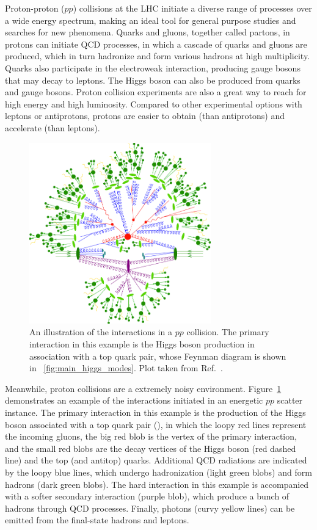 Proton-proton ($pp$) collisions at the LHC initiate a diverse range of processes over a wide energy spectrum,
making an ideal tool for general purpose studies and searches for new phenomena.
Quarks and gluons, together called partons, in protons can initiate QCD processes, 
in which a cascade of quarks and gluons are produced, which in turn hadronize and form various hadrons at high multiplicity.
Quarks also participate in the electroweak interaction, producing gauge bosons that may decay to leptons.
The Higgs boson can also be produced from quarks and gauge bosons.
Proton collision experiments are also a great way to reach for high energy and high luminosity.
Compared to other experimental options with leptons or antiprotons, 
protons are easier to obtain (than antiprotons) and accelerate (than leptons).

\begin{figure}[!htb]
    \centering
    \captionsetup{justification=justified}
    \includegraphics[width=0.70\textwidth]{pics/LHC_CMS/sherpa_sim.png}
    \caption{An illustration of the interactions in a $pp$ collision.
             The primary interaction in this example is the Higgs boson production in association with a top quark pair, 
             whose Feynman diagram is shown in ~\ref{fig:main_higgs_modes}.
             Plot taken from Ref.~\cite{Gleisberg_2009}.}
    \label{fig:sherpa_pp}
\end{figure}

Meanwhile, proton collisions are a extremely noisy environment.
Figure~\ref{fig:sherpa_pp} demonstrates an example of the interactions initiated in an energetic $pp$ scatter instance.
The primary interaction in this example is the production of the Higgs boson associated with a top quark pair (\ttH),
in which the loopy red lines represent the incoming gluons, the big red blob is the vertex of the primary interaction,
and the small red blobs are the decay vertices of the Higgs boson (red dashed line) and the top (and antitop) quarks.
Additional QCD radiations are indicated by the loopy blue lines, which undergo hadronization (light green blobs) and form hadrons (dark green blobs). 
The hard interaction in this example is accompanied with a softer secondary interaction (purple blob), 
which produce a bunch of hadrons through QCD processes.
Finally, photons (curvy yellow lines) can be emitted from the final-state hadrons and leptons.

